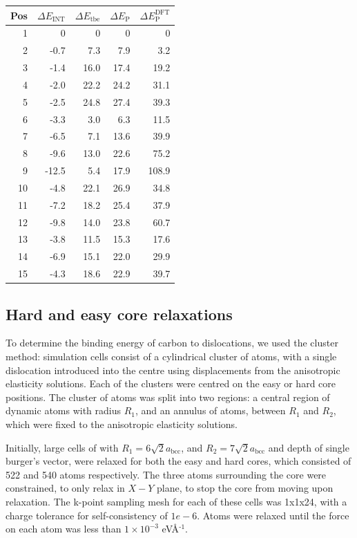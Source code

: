 \documentclass[a4paper,11pt]{article}
\begin{document}
\begin{center}
\begin{tabular}{rrrrr}
Pos & \(\Delta E_{\text{INT}}\) & \(\Delta E_{\text{tbe}}\) & \(\Delta E_{\text{P}}\) & \(\Delta E_{\text{P}}^{\text{DFT}}\)\\
\hline
1 & 0 & 0 & 0 & 0\\
2 & -0.7 & 7.3 & 7.9 & 3.2\\
3 & -1.4 & 16.0 & 17.4 & 19.2\\
4 & -2.0 & 22.2 & 24.2 & 31.1\\
5 & -2.5 & 24.8 & 27.4 & 39.3\\
6 & -3.3 & 3.0 & 6.3 & 11.5\\
7 & -6.5 & 7.1 & 13.6 & 39.9\\
8 & -9.6 & 13.0 & 22.6 & 75.2\\
9 & -12.5 & 5.4 & 17.9 & 108.9\\
10 & -4.8 & 22.1 & 26.9 & 34.8\\
11 & -7.2 & 18.2 & 25.4 & 37.9\\
12 & -9.8 & 14.0 & 23.8 & 60.7\\
13 & -3.8 & 11.5 & 15.3 & 17.6\\
14 & -6.9 & 15.1 & 22.0 & 29.9\\
15 & -4.3 & 18.6 & 22.9 & 39.7\\
\end{tabular}
\end{center}

\subsection{Hard and easy core relaxations}
\label{sec:org7b986a0}

To determine the binding energy of carbon to dislocations, we used the
cluster method: simulation cells consist of a cylindrical cluster of
atoms, with a single dislocation introduced into the
centre using displacements from the anisotropic elasticity solutions. Each of the clusters
were centred on the easy or hard core positions. The cluster of atoms was
split into two regions: a central region of dynamic atoms with radius \(R_1\),
and an annulus of atoms, between \(R_1\) and \(R_2\), which were fixed to the anisotropic
elasticity solutions. 

Initially, large cells of with \(R_1 = 6\sqrt{2}a_{\text{bcc}}\), and \(R_2 =
   7\sqrt{2}a_{\text{bcc}}\) and depth of single burger's vector, were relaxed
for both the easy and hard cores, which consisted of 522 and 540 atoms
respectively. The three atoms surrounding the core were constrained, to only
relax in \(X-Y\) plane, to stop the core from moving upon relaxation. The
k-point sampling mesh for each of these cells was 1x1x24, with a charge
tolerance for self-consistency of \(1e-6\). Atoms were relaxed until the force
on each atom was less than \(1\times10^{-3}\) eV\AA{}\(^{\text{-1}}\).  
\end{document}
